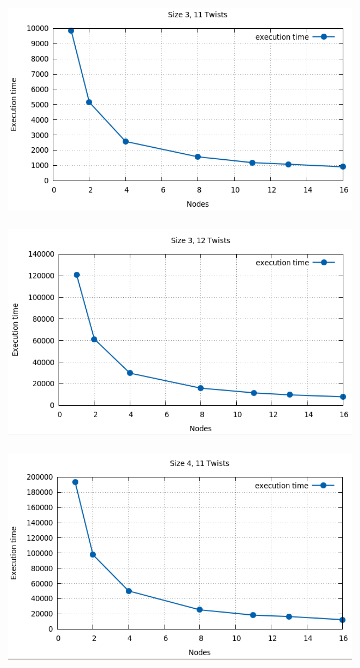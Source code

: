 \documentclass[a4paper]{article}
\begin{document}
\begin{figure}[!ht]
\begin{subfigure}{0.5\textwidth}
\centering
\includegraphics[width=\linewidth]{results/standard}
\end{subfigure} %
\begin{subfigure}{0.5\textwidth}
\centering
\includegraphics[width=\linewidth]{results/twists12}
\end{subfigure}
\begin{subfigure}{0.5\textwidth}
\centering
\includegraphics[width=\linewidth]{results/size4}

\end{subfigure}
\end{figure}
\end{document}
